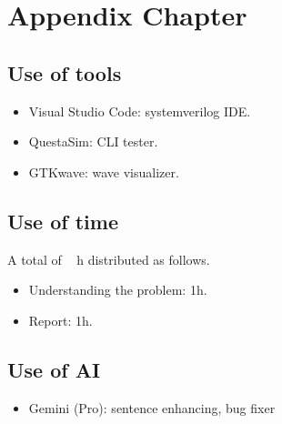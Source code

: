 \appendix
\chapter{Appendix Chapter}

\section{Use of tools}

\begin{itemize}
    \item Visual Studio Code: systemverilog IDE.
    \item QuestaSim: CLI tester.
    \item GTKwave: wave visualizer.
\end{itemize}

\section{Use of time}

A total of ~ h distributed as follows.

\begin{itemize}
    \item Understanding the problem: 1h.
    \item Report: 1h.
\end{itemize}

\section{Use of AI}

\begin{itemize}
    \item Gemini (Pro): sentence enhancing, bug fixer
\end{itemize}
